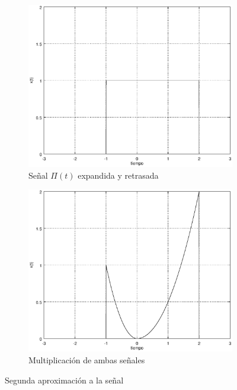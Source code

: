 \documentclass[10pt,a4paper]{report}
\begin{document}
\begin{figure}[H]
  \begin{center}
    
    \begin{subfigure}{0.5\textwidth}
      \begin{center}
        \includegraphics[width=1\linewidth]{./Ejercicio1/Aproximacion2a}
        \caption{Señal $\Pi(t)$ expandida y retrasada}
        \label{fig:Aprox2a}
      \end{center}
    \end{subfigure}%
    \begin{subfigure}{0.5\textwidth}
      \begin{center}
        \includegraphics[width=1\linewidth]{./Ejercicio1/Aproximacion2b}
        \caption{Multiplicación de ambas señales}
        \label{fig:Aprox2b}
      \end{center}
    \end{subfigure}
    
    \caption{Segunda aproximación a la señal}
    \label{fig:Aprox2}
  \end{center}
\end{figure}
\end{document}
